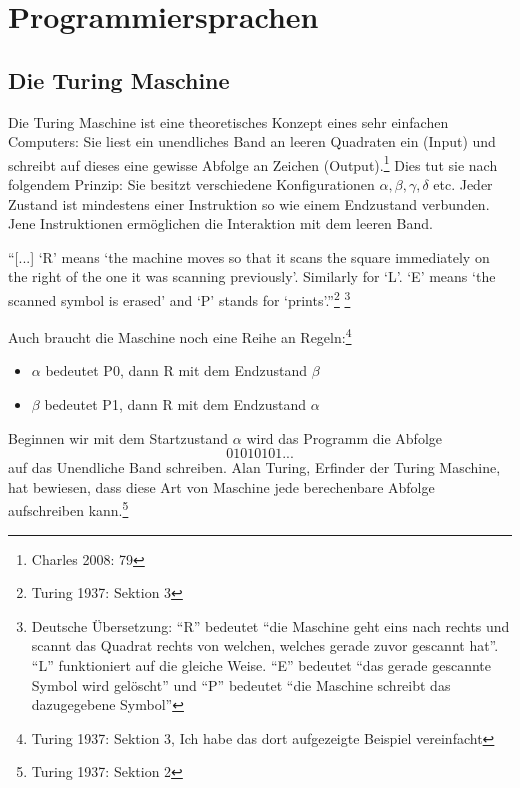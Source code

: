 \documentclass[10pt,a4paper]{article}
\begin{document}
\section{Programmiersprachen}
\subsection{Die Turing Maschine}
Die Turing Maschine ist eine theoretisches Konzept eines sehr einfachen Computers: Sie liest ein unendliches Band an leeren Quadraten ein (Input) und schreibt auf dieses eine gewisse Abfolge an Zeichen (Output).\footnote{Charles 2008: 79} Dies tut sie nach folgendem Prinzip: Sie besitzt verschiedene Konfigurationen $\alpha, \beta, \gamma, \delta$ etc. Jeder Zustand ist mindestens einer Instruktion so wie einem Endzustand verbunden. Jene Instruktionen ermöglichen die Interaktion mit dem leeren Band. 
\begin{displayquote}
\enquote{[...] \enquote{R} means \enquote{the machine moves
so that it scans the square immediately on the right of the one it was
scanning previously}. Similarly for \enquote{L}. \enquote{E} means \enquote{the scanned
symbol is erased} and \enquote{P} stands for \enquote{prints}.}\footnote{Turing 1937: Sektion 3} \footnote{Deutsche Übersetzung: \enquote{R} bedeutet \enquote{die Maschine geht eins nach rechts und scannt das Quadrat rechts von welchen, welches gerade zuvor gescannt hat}. \enquote{L} funktioniert auf die gleiche Weise. \enquote{E} bedeutet \enquote{das gerade gescannte Symbol wird gelöscht} und \enquote{P} bedeutet \enquote{die Maschine schreibt das dazugegebene Symbol}}
\end{displayquote}
Auch braucht die Maschine noch eine Reihe an Regeln:\footnote{Turing 1937: Sektion 3, Ich habe das dort aufgezeigte Beispiel vereinfacht}
\begin{itemize}
    \item $\alpha$ bedeutet P0, dann R mit dem Endzustand $\beta$
    \item $\beta$ bedeutet P1, dann R mit dem Endzustand $\alpha$
\end{itemize}
Beginnen wir mit dem Startzustand $\alpha$ wird das Programm die Abfolge $$01010101...$$ auf das Unendliche Band schreiben. Alan Turing, Erfinder der Turing Maschine, hat bewiesen, dass diese Art von Maschine jede berechenbare Abfolge aufschreiben kann.\footnote{Turing 1937: Sektion 2}
\end{document}
